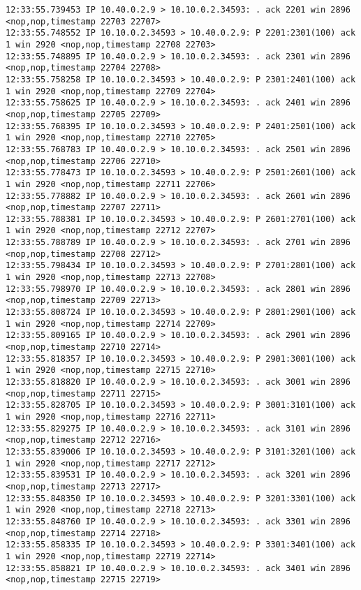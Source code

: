 \documentclass[a4paper,12pt]{article}
\begin{document}
\begin{lstlisting}
12:33:55.739453 IP 10.40.0.2.9 > 10.10.0.2.34593: . ack 2201 win 2896 <nop,nop,timestamp 22703 22707>
12:33:55.748552 IP 10.10.0.2.34593 > 10.40.0.2.9: P 2201:2301(100) ack 1 win 2920 <nop,nop,timestamp 22708 22703>
12:33:55.748895 IP 10.40.0.2.9 > 10.10.0.2.34593: . ack 2301 win 2896 <nop,nop,timestamp 22704 22708>
12:33:55.758258 IP 10.10.0.2.34593 > 10.40.0.2.9: P 2301:2401(100) ack 1 win 2920 <nop,nop,timestamp 22709 22704>
12:33:55.758625 IP 10.40.0.2.9 > 10.10.0.2.34593: . ack 2401 win 2896 <nop,nop,timestamp 22705 22709>
12:33:55.768395 IP 10.10.0.2.34593 > 10.40.0.2.9: P 2401:2501(100) ack 1 win 2920 <nop,nop,timestamp 22710 22705>
12:33:55.768783 IP 10.40.0.2.9 > 10.10.0.2.34593: . ack 2501 win 2896 <nop,nop,timestamp 22706 22710>
12:33:55.778473 IP 10.10.0.2.34593 > 10.40.0.2.9: P 2501:2601(100) ack 1 win 2920 <nop,nop,timestamp 22711 22706>
12:33:55.778882 IP 10.40.0.2.9 > 10.10.0.2.34593: . ack 2601 win 2896 <nop,nop,timestamp 22707 22711>
12:33:55.788381 IP 10.10.0.2.34593 > 10.40.0.2.9: P 2601:2701(100) ack 1 win 2920 <nop,nop,timestamp 22712 22707>
12:33:55.788789 IP 10.40.0.2.9 > 10.10.0.2.34593: . ack 2701 win 2896 <nop,nop,timestamp 22708 22712>
12:33:55.798434 IP 10.10.0.2.34593 > 10.40.0.2.9: P 2701:2801(100) ack 1 win 2920 <nop,nop,timestamp 22713 22708>
12:33:55.798970 IP 10.40.0.2.9 > 10.10.0.2.34593: . ack 2801 win 2896 <nop,nop,timestamp 22709 22713>
12:33:55.808724 IP 10.10.0.2.34593 > 10.40.0.2.9: P 2801:2901(100) ack 1 win 2920 <nop,nop,timestamp 22714 22709>
12:33:55.809165 IP 10.40.0.2.9 > 10.10.0.2.34593: . ack 2901 win 2896 <nop,nop,timestamp 22710 22714>
12:33:55.818357 IP 10.10.0.2.34593 > 10.40.0.2.9: P 2901:3001(100) ack 1 win 2920 <nop,nop,timestamp 22715 22710>
12:33:55.818820 IP 10.40.0.2.9 > 10.10.0.2.34593: . ack 3001 win 2896 <nop,nop,timestamp 22711 22715>
12:33:55.828705 IP 10.10.0.2.34593 > 10.40.0.2.9: P 3001:3101(100) ack 1 win 2920 <nop,nop,timestamp 22716 22711>
12:33:55.829275 IP 10.40.0.2.9 > 10.10.0.2.34593: . ack 3101 win 2896 <nop,nop,timestamp 22712 22716>
12:33:55.839006 IP 10.10.0.2.34593 > 10.40.0.2.9: P 3101:3201(100) ack 1 win 2920 <nop,nop,timestamp 22717 22712>
12:33:55.839531 IP 10.40.0.2.9 > 10.10.0.2.34593: . ack 3201 win 2896 <nop,nop,timestamp 22713 22717>
12:33:55.848350 IP 10.10.0.2.34593 > 10.40.0.2.9: P 3201:3301(100) ack 1 win 2920 <nop,nop,timestamp 22718 22713>
12:33:55.848760 IP 10.40.0.2.9 > 10.10.0.2.34593: . ack 3301 win 2896 <nop,nop,timestamp 22714 22718>
12:33:55.858335 IP 10.10.0.2.34593 > 10.40.0.2.9: P 3301:3401(100) ack 1 win 2920 <nop,nop,timestamp 22719 22714>
12:33:55.858821 IP 10.40.0.2.9 > 10.10.0.2.34593: . ack 3401 win 2896 <nop,nop,timestamp 22715 22719>

\end{lstlisting}
\end{document}
